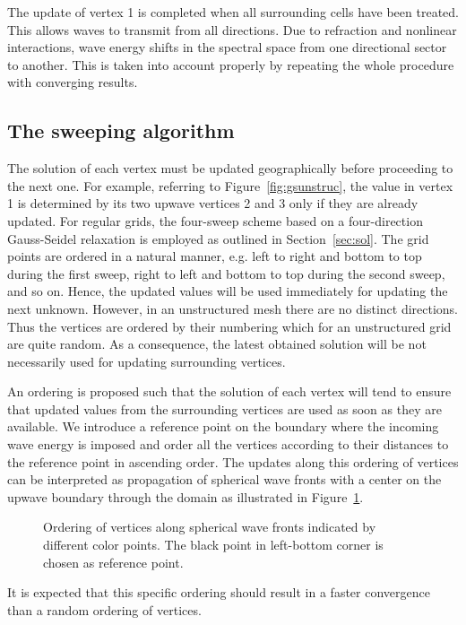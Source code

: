 \documentclass[12pt]{book}
\begin{document}
The update of vertex 1 is completed when all surrounding cells have been treated. This allows waves to transmit from all directions.
Due to refraction and nonlinear interactions, wave energy shifts in the spectral space from one directional sector to another. This is taken into account properly
by repeating the whole procedure with
converging results.

\subsection{The sweeping algorithm}

The solution of each vertex must be updated geographically before proceeding to the next one. For example, referring to Figure~\ref{fig:gsunstruc},
the value in vertex 1 is determined by its two upwave vertices 2 and 3 only if they are already updated.
For regular grids, the four-sweep scheme based on a four-direction Gauss-Seidel relaxation is employed as outlined in Section~\ref{sec:sol}.
The grid points are ordered in a natural manner, e.g. left to right and bottom to top during the first sweep, right to left and bottom to top during the second
sweep, and so on.
Hence, the updated values will be used immediately for updating the next unknown.
However,
in an unstructured mesh there are no distinct directions. Thus the vertices are ordered by their numbering which for
an unstructured grid are quite random. As a consequence, the latest obtained solution will be not necessarily used for updating surrounding vertices.

An ordering is proposed such that
the solution of each vertex will tend to ensure that updated values from the surrounding vertices are used as soon as they are available.
We introduce a reference point on the boundary where the incoming wave energy is imposed
and order all the vertices according to their distances to the reference point in ascending order.
The updates along this ordering of vertices can be interpreted as propagation of spherical wave fronts with a center
on the upwave boundary through the domain as illustrated in Figure~\ref{fig:wavefronts}.
\begin{figure}[htb]
   \centerline{
              }
      \caption{Ordering of vertices along spherical wave fronts indicated by different color points. The black point in left-bottom corner is chosen as reference point.}
      \label{fig:wavefronts}
\end{figure}
It is expected that this specific ordering should result in a faster convergence than a random ordering of vertices.
\end{document}
